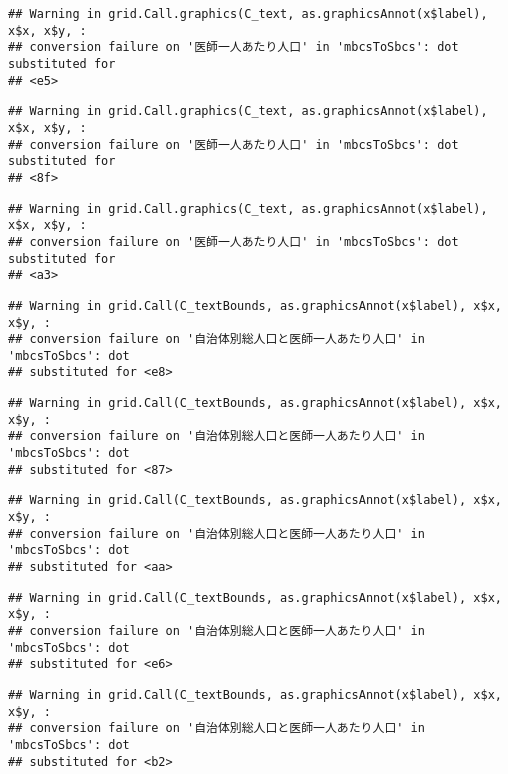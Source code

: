 \documentclass[
]{article}
\begin{document}
\begin{verbatim}
## Warning in grid.Call.graphics(C_text, as.graphicsAnnot(x$label), x$x, x$y, :
## conversion failure on '医師一人あたり人口' in 'mbcsToSbcs': dot substituted for
## <e5>
\end{verbatim}

\begin{verbatim}
## Warning in grid.Call.graphics(C_text, as.graphicsAnnot(x$label), x$x, x$y, :
## conversion failure on '医師一人あたり人口' in 'mbcsToSbcs': dot substituted for
## <8f>
\end{verbatim}

\begin{verbatim}
## Warning in grid.Call.graphics(C_text, as.graphicsAnnot(x$label), x$x, x$y, :
## conversion failure on '医師一人あたり人口' in 'mbcsToSbcs': dot substituted for
## <a3>
\end{verbatim}

\begin{verbatim}
## Warning in grid.Call(C_textBounds, as.graphicsAnnot(x$label), x$x, x$y, :
## conversion failure on '自治体別総人口と医師一人あたり人口' in 'mbcsToSbcs': dot
## substituted for <e8>
\end{verbatim}

\begin{verbatim}
## Warning in grid.Call(C_textBounds, as.graphicsAnnot(x$label), x$x, x$y, :
## conversion failure on '自治体別総人口と医師一人あたり人口' in 'mbcsToSbcs': dot
## substituted for <87>
\end{verbatim}

\begin{verbatim}
## Warning in grid.Call(C_textBounds, as.graphicsAnnot(x$label), x$x, x$y, :
## conversion failure on '自治体別総人口と医師一人あたり人口' in 'mbcsToSbcs': dot
## substituted for <aa>
\end{verbatim}

\begin{verbatim}
## Warning in grid.Call(C_textBounds, as.graphicsAnnot(x$label), x$x, x$y, :
## conversion failure on '自治体別総人口と医師一人あたり人口' in 'mbcsToSbcs': dot
## substituted for <e6>
\end{verbatim}

\begin{verbatim}
## Warning in grid.Call(C_textBounds, as.graphicsAnnot(x$label), x$x, x$y, :
## conversion failure on '自治体別総人口と医師一人あたり人口' in 'mbcsToSbcs': dot
## substituted for <b2>
\end{verbatim}
\end{document}
